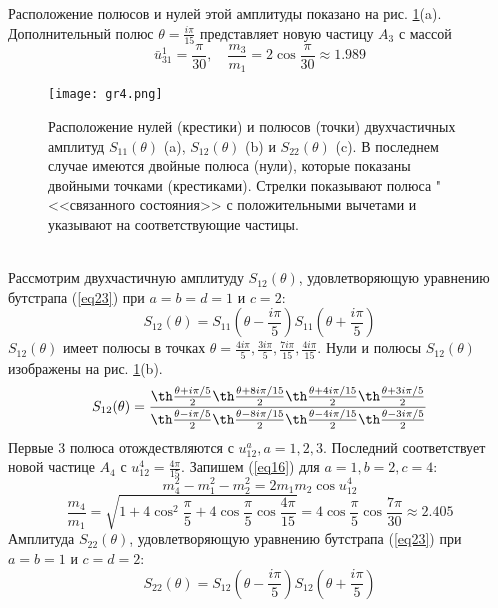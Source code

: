 \documentclass[12pt]{article}
\theoremstyle{definition}
\begin{document}
Расположение полюсов и нулей этой амплитуды показано на рис. \ref{gr4}(a). Дополнительный полюс $\theta=\frac{i\pi}{15}$ представляет новую частицу $A_3$ с массой
\begin{equation}
    \bar{u}^1_{31}=\frac{\pi}{30},\quad\frac{m_3}{m_1}=2\cos\frac{\pi}{30}\approx1.989
\end{equation}
\begin{figure}[h!]
    \centering
    \texttt{[image: gr4.png]}
    \caption{Расположение нулей (крестики) и полюсов (точки) двухчастичных амплитуд $S_{11}(\theta)$ (a), $S_{12}(\theta)$ (b) и $S_{22}(\theta)$ (c). В последнем случае имеются двойные полюса (нули), которые показаны двойными точками (крестиками). Стрелки показывают полюса "<<связанного состояния>> с положительными вычетами и указывают на соответствующие частицы.}
    \label{gr4}
\end{figure}\\
Рассмотрим двухчастичную амплитуду $S_{12}(\theta)$, удовлетворяющую уравнению бутстрапа (\ref{eq23}) при $a = b = d = 1$ и $c=2$:
\begin{equation}
    S_{12}(\theta)=S_{11}\left(\theta-\frac{i\pi}{5}\right)S_{11}\left(\theta+\frac{i\pi}{5}\right)
\end{equation}
$S_{12}(\theta)$ имеет полюсы в точках $\theta=\frac{4i\pi}{5},\frac{3i\pi}{5},\frac{7i\pi}{15},\frac{4i\pi}{15}$. Нули и полюсы $S_{12}(\theta)$ изображены на рис. \ref{gr4}(b).
\begin{equation}
    S_{12}(\theta)=\frac{\th\frac{\theta+i\pi/5}{2}\th\frac{\theta+8i\pi/15}{2}\th\frac{\theta+4i\pi/15}{2}\th\frac{\theta+3i\pi/5}{2}}{\th\frac{\theta-i\pi/5}{2}\th\frac{\theta-8i\pi/15}{2}\th\frac{\theta-4i\pi/15}{2}\th\frac{\theta-3i\pi/5}{2}}
\end{equation}
Первые 3 полюса отождествляются с $u^a_{12},a=1,2,3$. Последний соответствует новой частице $A_4$ с $u^4_{12}=\frac{4\pi}{15}$. Запишем (\ref{eq16}) для $a=1,b=2,c=4$:
\begin{equation}
    m_4^2-m_1^2-m_2^2=2m_1m_2\cos u_{12}^4
\end{equation}
\begin{equation}
    \frac{m_4}{m_1}=\sqrt{1+4\cos^2\frac{\pi}{5}+4\cos\frac{\pi}{5}\cos\frac{4\pi}{15}}=4\cos\frac{\pi}{5}\cos\frac{7\pi}{30}\approx2.405
\end{equation}
Амплитуда $S_{22}(\theta)$, удовлетворяющую уравнению бутстрапа (\ref{eq23}) при $a=b=1$ и $c=d=2$:
\begin{equation}
    S_{22}(\theta)=S_{12}\left(\theta-\frac{i\pi}{5}\right)S_{12}\left(\theta+\frac{i\pi}{5}\right)
\end{equation}
\end{document}
